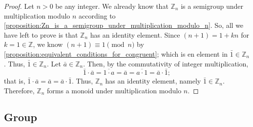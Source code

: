 \documentclass[12pt, titlepage]{amsart}
\newcommand\Z{{\mathbb Z}}
\theoremstyle{definition}
\begin{document}
	\begin{proof}
		Let $n>0$ be any integer.
		We already know that $\Z_n$ is a semigroup under multiplication modulo $n$ according to \cref{proposition:Zn_is_a_semigroup_under_multiplication_modulo_n}.
		So, all we have left to prove is that $\Z_n$ has an identity element.
		Since $(n+1) = 1 + kn$ for $k=1 \in \Z$, we know $(n+1) \equiv 1 \pmod n$ by \cref{proposition:equivalent_conditions_for_congruent}; which is en element in $\bar{1} \in \Z_n$.
		Thus, $\bar{1} \in \Z_n$.
		Let $\bar{a} \in \Z_n$.
		Then, by the commutativity of integer multiplication, $$\bar{1} \cdot \bar{a} = \overline{1 \cdot a} = \bar{a} = \overline{a \cdot 1} = \bar{a} \cdot \bar{1};$$ that is, $\bar{1} \cdot \bar{a} = \bar{a} = \bar{a} \cdot \bar{1}$.
		Thus, $\Z_n$ has an identity element, namely $\bar{1} \in \Z_n$.
		Therefore, $\Z_n$ forms a monoid under multiplication modulo $n$.
%		
%		
	\end{proof}
	
	
	\subsection{Group}
	
\end{document}
